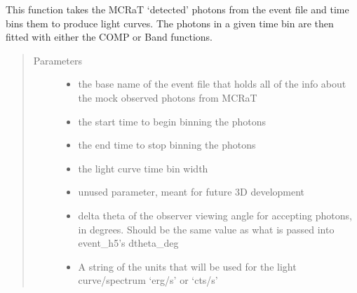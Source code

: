 \documentclass[letterpaper,10pt,english]{sphinxmanual}
\begin{document}
\begin{fulllineitems}
\label{\detokenize{read_process_files:read_process_files.lcur_param}}
This function takes the MCRaT ‘detected’ photons from the event file and time bins them to produce light curves. The
photons in a given time bin are then fitted with either the COMP or Band functions.
\begin{quote}\begin{description}
\item[{Parameters}] \leavevmode\begin{itemize}
\item {} 
 \textendash{} the base name of the event file that holds all of the info about the mock observed photons
from MCRaT

\item {} 
 \textendash{} the start time to begin binning the photons

\item {} 
 \textendash{} the end time to stop binning the photons

\item {} 
 \textendash{} the light curve time bin width

\item {} 
 \textendash{} unused parameter, meant for future 3D development

\item {} 
 \textendash{} delta theta of the observer viewing angle for accepting photons, in degrees. Should be the same
value as what is passed into event\_h5’s dtheta\_deg

\item {} 
 \textendash{} A string of the units that will be used for the light curve/spectrum ‘erg/s’ or ‘cts/s’


\end{itemize}
\end{description}
\end{quote}
\end{fulllineitems}
\end{document}

